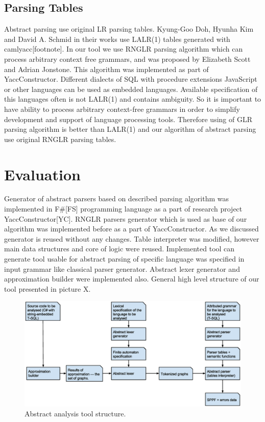 \documentclass{sigplanconf}
\begin{document}
\subsection{Parsing Tables}
Abstract parsing use original LR parsing tables. Kyung-Goo Doh, Hyunha Kim and David A. Schmid in their works use LALR(1) tables generated with camlyacc[footnote]. In our tool we use RNGLR parsing algorithm which can process arbitrary context free grammars, and was proposed by Elizabeth Scott and Adrian Jonstone. This algorithm was implemented as part of YaccConstructor. Different dialects of SQL with procedure extensions JavaScript or other languages can be used as embedded languages. Available specification of this languages often is not LALR(1) and contains ambiguity.  So it is important to have ability to process arbitrary context-free grammars in order to simplify development and support of language processing tools. Therefore using of GLR parsing algorithm is better than LALR(1) and our algorithm of abstract parsing use original RNGLR parsing tables. 

\section{Evaluation}
Generator of abstract parsers based on described parsing algorithm was implemented in F\#[FS] programming language as a part of research project YaccConstructor[YC]. RNGLR parsers generator which is used as base of our algorithm was implemented before as a part of YaccConstructor. As we discussed generator is reused without any changes. Table interpreter was modified, however main data structures and core of logic were reused. Implemented tool can generate tool usable for abstract parsing of specific language was specified in input grammar  like classical parser generator. Abstract lexer generator and approximation builder were implemented also. General high level structure of our tool presented in picture X.

\begin{figure}
    \begin{center}
        \includegraphics[scale=0.25]{Graphs/General_structure_of_generator.eps}
    \end{center}
    \caption{Abstract analysis tool structure.}
    \label{fig-ffsm}
\end{figure}
\end{document}
